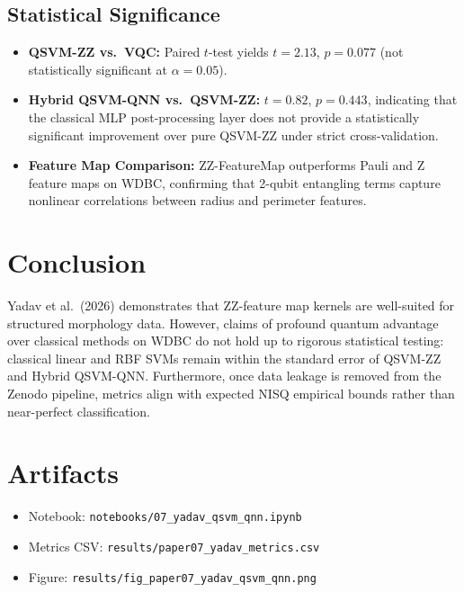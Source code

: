 \documentclass[12pt,a4paper]{article}
\begin{document}
\subsection{Statistical Significance}
\begin{itemize}[leftmargin=*]
  \item \textbf{QSVM-ZZ vs.\ VQC:} Paired $t$-test yields $t = 2.13$, $p = 0.077$ (not statistically significant at $\alpha = 0.05$).
  \item \textbf{Hybrid QSVM-QNN vs.\ QSVM-ZZ:} $t = 0.82$, $p = 0.443$, indicating that the classical MLP post-processing layer does not provide a statistically significant improvement over pure QSVM-ZZ under strict cross-validation.
  \item \textbf{Feature Map Comparison:} ZZ-FeatureMap outperforms Pauli and Z feature maps on WDBC, confirming that 2-qubit entangling terms capture nonlinear correlations between radius and perimeter features.
\end{itemize}

\section{Conclusion}
Yadav et al.\ (2026) demonstrates that ZZ-feature map kernels are well-suited for structured morphology data. However, claims of profound quantum advantage over classical methods on WDBC do not hold up to rigorous statistical testing: classical linear and RBF SVMs remain within the standard error of QSVM-ZZ and Hybrid QSVM-QNN. Furthermore, once data leakage is removed from the Zenodo pipeline, metrics align with expected NISQ empirical bounds rather than near-perfect classification.

\appendix
\section{Artifacts}
\begin{itemize}
  \item Notebook: \texttt{notebooks/07\_yadav\_qsvm\_qnn.ipynb}
  \item Metrics CSV: \texttt{results/paper07\_yadav\_metrics.csv}
  \item Figure: \texttt{results/fig\_paper07\_yadav\_qsvm\_qnn.png}
\end{itemize}
\end{document}

